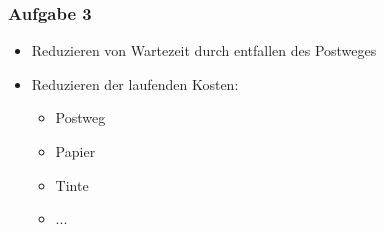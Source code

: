 \documentclass{beamer}
\begin{document}
\begin{frame}
\frametitle{Aufgabe 3}

\begin{itemize}
\setlength\itemsep{2em}
\item Reduzieren von Wartezeit durch entfallen des Postweges
\item Reduzieren der laufenden Kosten:
	\begin{itemize}
	\setlength\itemsep{1em}	
	\item Postweg
	\item Papier
	\item Tinte
	\item ...
	\end{itemize}
\end{itemize}

\end{frame}
\end{document}
